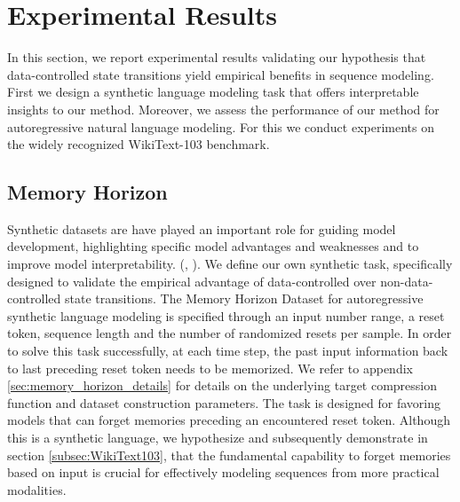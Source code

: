 \documentclass{article} \usepackage{iclr2024_conference,times}
\begin{document}
\section{Experimental Results}\label{sec:experiments}

In this section, we report experimental results validating our hypothesis that data-controlled state transitions yield empirical benefits in sequence modeling. First we design a synthetic language modeling task that offers interpretable insights to our method. Moreover, we assess the performance of our method for autoregressive natural language modeling. For this we conduct experiments on the widely recognized WikiText-103 benchmark.

\subsection{Memory Horizon}

Synthetic datasets are have played an important role for guiding model development, highlighting specific model advantages and weaknesses and to improve model interpretability. (\cite{olsson2022incontext}, \cite{fu2023hungry}). We define our own synthetic task, specifically designed to validate the empirical advantage of data-controlled over non-data-controlled state transitions. The Memory Horizon Dataset for autoregressive synthetic language modeling is specified through an input number range, a reset token, sequence length and the number of randomized resets per sample. In order to solve this task successfully, at each time step, the past input information back to last preceding reset token needs to be memorized. We refer to appendix \ref{sec:memory_horizon_details} for details on the underlying target compression function and dataset construction parameters. The task is designed for favoring models that can forget memories preceding an encountered reset token. Although this is a synthetic language, we hypothesize and subsequently demonstrate in section \ref{subsec:WikiText103}, that the fundamental capability to forget memories based on input is crucial for effectively modeling sequences from more practical modalities.
\end{document}
